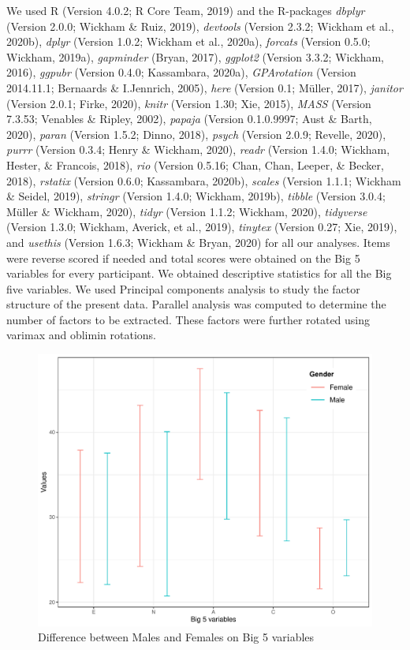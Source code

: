 \documentclass[
  english,
  man]{apa6}
\begin{document}
We used R (Version 4.0.2; R Core Team, 2019) and the R-packages \emph{dbplyr} (Version 2.0.0; Wickham \& Ruiz, 2019), \emph{devtools} (Version 2.3.2; Wickham et al., 2020b), \emph{dplyr} (Version 1.0.2; Wickham et al., 2020a), \emph{forcats} (Version 0.5.0; Wickham, 2019a), \emph{gapminder} (Bryan, 2017), \emph{ggplot2} (Version 3.3.2; Wickham, 2016), \emph{ggpubr} (Version 0.4.0; Kassambara, 2020a), \emph{GPArotation} (Version 2014.11.1; Bernaards \& I.Jennrich, 2005), \emph{here} (Version 0.1; Müller, 2017), \emph{janitor} (Version 2.0.1; Firke, 2020), \emph{knitr} (Version 1.30; Xie, 2015), \emph{MASS} (Version 7.3.53; Venables \& Ripley, 2002), \emph{papaja} (Version 0.1.0.9997; Aust \& Barth, 2020), \emph{paran} (Version 1.5.2; Dinno, 2018), \emph{psych} (Version 2.0.9; Revelle, 2020), \emph{purrr} (Version 0.3.4; Henry \& Wickham, 2020), \emph{readr} (Version 1.4.0; Wickham, Hester, \& Francois, 2018), \emph{rio} (Version 0.5.16; Chan, Chan, Leeper, \& Becker, 2018), \emph{rstatix} (Version 0.6.0; Kassambara, 2020b), \emph{scales} (Version 1.1.1; Wickham \& Seidel, 2019), \emph{stringr} (Version 1.4.0; Wickham, 2019b), \emph{tibble} (Version 3.0.4; Müller \& Wickham, 2020), \emph{tidyr} (Version 1.1.2; Wickham, 2020), \emph{tidyverse} (Version 1.3.0; Wickham, Averick, et al., 2019), \emph{tinytex} (Version 0.27; Xie, 2019), and \emph{usethis} (Version 1.6.3; Wickham \& Bryan, 2020) for all our analyses. Items were reverse scored if needed and total scores were obtained on the Big 5 variables for every participant. We obtained descriptive statistics for all the Big five variables. We used Principal components analysis to study the factor structure of the present data. Parallel analysis was computed to determine the number of factors to be extracted. These factors were further rotated using varimax and oblimin rotations.

\begin{figure}
\centering
\includegraphics{final_project_files/figure-latex/errorbars-1.pdf}
\caption{\label{fig:errorbars}Difference between Males and Females on Big 5 variables}
\end{figure}
\end{document}
